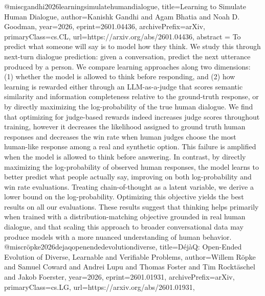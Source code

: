 {}@misc{gandhi2026learningsimulatehumandialogue,
      title={Learning to Simulate Human Dialogue}, 
      author={Kanishk Gandhi and Agam Bhatia and Noah D. Goodman},
      year={2026},
      eprint={2601.04436},
      archivePrefix={arXiv},
      primaryClass={cs.CL},
      url={https://arxiv.org/abs/2601.04436},
      abstract = {To predict what someone will say is to model how they think. We study this through next-turn dialogue prediction: given a conversation, predict the next utterance produced by a person. We compare learning approaches along two dimensions: (1) whether the model is allowed to think before responding, and (2) how learning is rewarded either through an LLM-as-a-judge that scores semantic similarity and information completeness relative to the ground-truth response, or by directly maximizing the log-probability of the true human dialogue. We find that optimizing for judge-based rewards indeed increases judge scores throughout training, however it decreases the likelihood assigned to ground truth human responses and decreases the win rate when human judges choose the most human-like response among a real and synthetic option. This failure is amplified when the model is allowed to think before answering. In contrast, by directly maximizing the log-probability of observed human responses, the model learns to better predict what people actually say, improving on both log-probability and win rate evaluations. Treating chain-of-thought as a latent variable, we derive a lower bound on the log-probability. Optimizing this objective yields the best results on all our evaluations. These results suggest that thinking helps primarily when trained with a distribution-matching objective grounded in real human dialogue, and that scaling this approach to broader conversational data may produce models with a more nuanced understanding of human behavior.}
}@misc{röpke2026dejaqopenendedevolutiondiverse,
      title={D\'ej\`aQ: Open-Ended Evolution of Diverse, Learnable and Verifiable Problems}, 
      author={Willem Röpke and Samuel Coward and Andrei Lupu and Thomas Foster and Tim Rocktäschel and Jakob Foerster},
      year={2026},
      eprint={2601.01931},
      archivePrefix={arXiv},
      primaryClass={cs.LG},
      url={https://arxiv.org/abs/2601.01931},
}
